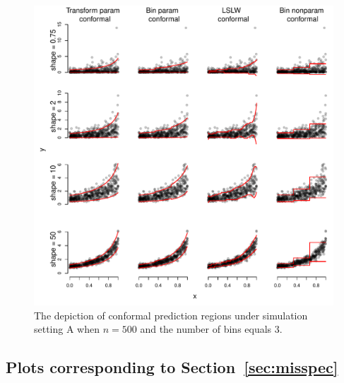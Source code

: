 \documentclass[11pt]{article}\usepackage[]{graphicx}\usepackage[]{color}
\makeatletter
\def\maxwidth{ %
  \ifdim\Gin@nat@width>\linewidth
    \linewidth
  \else
    \Gin@nat@width
  \fi
}
\newenvironment{knitrout}{}{} %
\makeatother
\begin{document}
\newpage
\begin{figure}[h!]
\begin{center}
\begin{knitrout}
\color{fgcolor}
\includegraphics[width=\maxwidth]{figure/conformal-plots-A-500-1} 

\end{knitrout}
\end{center}
\caption{The depiction of conformal prediction regions under simulation 
  setting A when $n = 500$ and the number of bins equals 3.
}
\label{conformal-plots-A-500}
\end{figure}



\newpage
\subsection{Plots corresponding to Section~\ref{sec:misspec}}
\label{sec:misspecplots}
\end{document}
